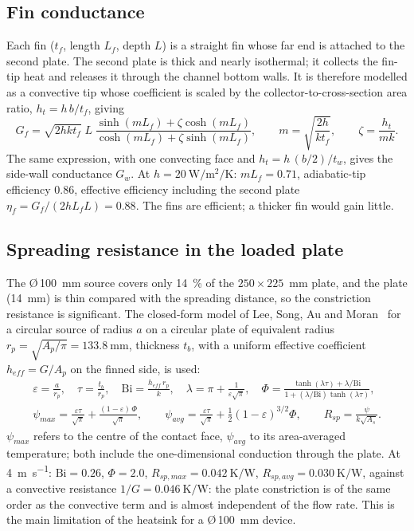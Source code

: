 \documentclass[11pt,a4paper]{article}
\begin{document}
\subsection{Fin conductance}\label{sec:fin}

Each fin ($t_f$, length $L_f$, depth $L$) is a straight fin whose far end is attached to the second plate. The second plate is thick and nearly isothermal; it collects the fin-tip heat and releases it through the channel bottom walls. It is therefore modelled as a convective tip whose coefficient is scaled by the collector-to-cross-section area ratio, $h_t = h\,b/t_f$, giving
\begin{equation}
G_f = \sqrt{2 h k t_f}\;L\;\frac{\sinh(mL_f)+\zeta\cosh(mL_f)}{\cosh(mL_f)+\zeta\sinh(mL_f)},\qquad
m=\sqrt{\frac{2h}{k t_f}},\qquad \zeta=\frac{h_t}{mk}.
\label{eq:fin}
\end{equation}
The same expression, with one convecting face and $h_t = h\,(b/2)/t_w$, gives the side-wall conductance $G_w$. At $h=\SI{20}{\watt\per\metre\squared\per\kelvin}$: $mL_f=0.71$, adiabatic-tip efficiency $0.86$, effective efficiency including the second plate $\eta_f = G_f/(2hL_fL)=0.88$. The fins are efficient; a thicker fin would gain little.

\subsection{Spreading resistance in the loaded plate}\label{sec:spread}

The \O\,\SI{100}{\milli\metre} source covers only \SI{14}{\percent} of the $250\times225$~mm plate, and the plate (\SI{14}{\milli\metre}) is thin compared with the spreading distance, so the constriction resistance is significant. The closed-form model of Lee, Song, Au and Moran~\cite{lee1995} for a circular source of radius $a$ on a circular plate of equivalent radius $r_p=\sqrt{A_p/\pi}=\SI{133.8}{\milli\metre}$, thickness $t_b$, with a uniform effective coefficient $h_{eff}=G/A_p$ on the finned side, is used:
\begin{gather}
\varepsilon=\frac{a}{r_p},\quad \tau=\frac{t_b}{r_p},\quad \mathrm{Bi}=\frac{h_{eff}\,r_p}{k},\quad
\lambda=\pi+\frac{1}{\varepsilon\sqrt{\pi}},\quad
\Phi=\frac{\tanh(\lambda\tau)+\lambda/\mathrm{Bi}}{1+(\lambda/\mathrm{Bi})\tanh(\lambda\tau)},\nonumber\\
\psi_{max}=\frac{\varepsilon\tau}{\sqrt{\pi}}+\frac{(1-\varepsilon)\,\Phi}{\sqrt{\pi}},\qquad
\psi_{avg}=\frac{\varepsilon\tau}{\sqrt{\pi}}+\tfrac12(1-\varepsilon)^{3/2}\Phi,\qquad
R_{sp}=\frac{\psi}{k\sqrt{A_s}} .
\label{eq:lee}
\end{gather}
$\psi_{max}$ refers to the centre of the contact face, $\psi_{avg}$ to its area-averaged temperature; both include the one-dimensional conduction through the plate. At \SI{4}{\metre\per\second}: $\mathrm{Bi}=0.26$, $\Phi=2.0$, $R_{sp,max}=\SI{0.042}{\kelvin\per\watt}$, $R_{sp,avg}=\SI{0.030}{\kelvin\per\watt}$, against a convective resistance $1/G=\SI{0.046}{\kelvin\per\watt}$: the plate constriction is of the same order as the convective term and is almost independent of the flow rate. This is the main limitation of the heatsink for a \O\,\SI{100}{\milli\metre} device.
\end{document}
